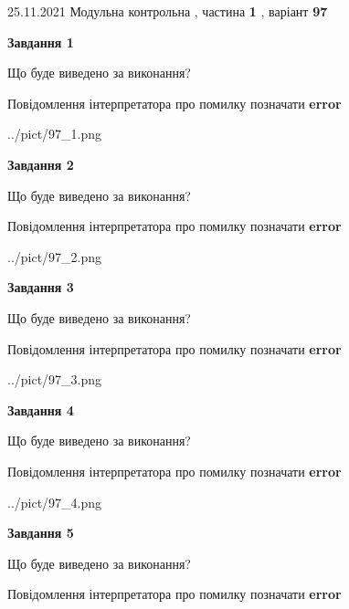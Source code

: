 \documentclass[10pt, ukrainian]{article}
\begin{document}
{25.11.2021 Модульна контрольна , частина \textbf { 1 }, варіант  \No \textbf { 97 }\par}
{
\begin {large}

{\begin {center}\textbf{Завдання 1}\end {center}}\par
Що буде виведено за виконання? \par
Повідомлення інтерпретатора про помилку позначати \textbf{error}

\begin{center}
	{../pict/97_1.png}
\end{center}
\newpage

{\begin {center}\textbf{Завдання 2}\end {center}}\par
Що буде виведено за виконання? \par
Повідомлення інтерпретатора про помилку позначати \textbf{error}

\begin{center}
	{../pict/97_2.png}
\end{center}
\newpage

{\begin {center}\textbf{Завдання 3}\end {center}}\par
Що буде виведено за виконання? \par
Повідомлення інтерпретатора про помилку позначати \textbf{error}

\begin{center}
	{../pict/97_3.png}
\end{center}
\newpage

{\begin {center}\textbf{Завдання 4}\end {center}}\par
Що буде виведено за виконання? \par
Повідомлення інтерпретатора про помилку позначати \textbf{error}

\begin{center}
	{../pict/97_4.png}
\end{center}
\newpage

{\begin {center}\textbf{Завдання 5}\end {center}}\par
Що буде виведено за виконання? \par
Повідомлення інтерпретатора про помилку позначати \textbf{error}


\end{large}}
\end{document}
